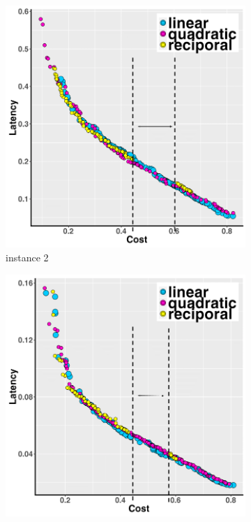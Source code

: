 \documentclass[10pt,journal,compsoc]{IEEEtran}
\begin{document}
\begin{figure}[h!]
   \centering
   \begin{subfigure}{0.49\linewidth}
       \includegraphics[width=\textwidth]{pics/dynamic_problem_2.png}
    \caption{instance 2}
   \end{subfigure}
   \begin{subfigure}{0.49\linewidth}
       \includegraphics[width=\textwidth]{pics/dynamic_problem_3.png}

\end{subfigure}
\end{figure}
\end{document}
